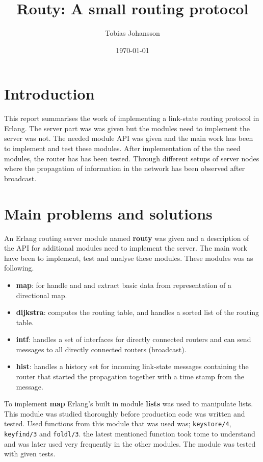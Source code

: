 \documentclass[a4paper, 11pt]{article}
\title{Routy: A small routing protocol}
\author{Tobias Johansson}
\date{\today{}}
\begin{document}
\maketitle

\section{Introduction}
This report summarises the work of implementing a link-state routing protocol in Erlang. The server part was was given but the modules need to implement the server was not. The needed module API was given and the main work has been to implement and test these modules. After implementation of the the need modules, the router has has been tested. Through different setups of server nodes where the propagation of information in the network has been observed after broadcast.

\section{Main problems and solutions}
An Erlang routing server module named \textbf{routy} was given and a description of the API for additional modules need to implement the server. The main work have been to implement, test and analyse these modules. These modules was as following.

\begin{itemize}
\item \textbf{map}: for handle and and extract basic data from representation of a directional map.
\item \textbf{dijkstra}: computes the routing table, and handles a sorted list of the routing table.
\item \textbf{intf}: handles a set of interfaces for directly connected routers and can send messages to all directly connected routers (broadcast).
\item \textbf{hist}: handles a history set for incoming link-state messages containing the router that started the propagation together with a time stamp from the message.
\end{itemize}

To implement \textbf{map} Erlang's built in module \textbf{lists} was used to manipulate lists. This module was studied thoroughly before production code was written and tested. Used functions from this module that was used was; \verb!keystore/4!,  \verb!keyfind/3! and \verb!foldl/3!. the latest mentioned function took tome to understand and was later used very frequently in the other modules. The module was tested with given tests.
\end{document}
